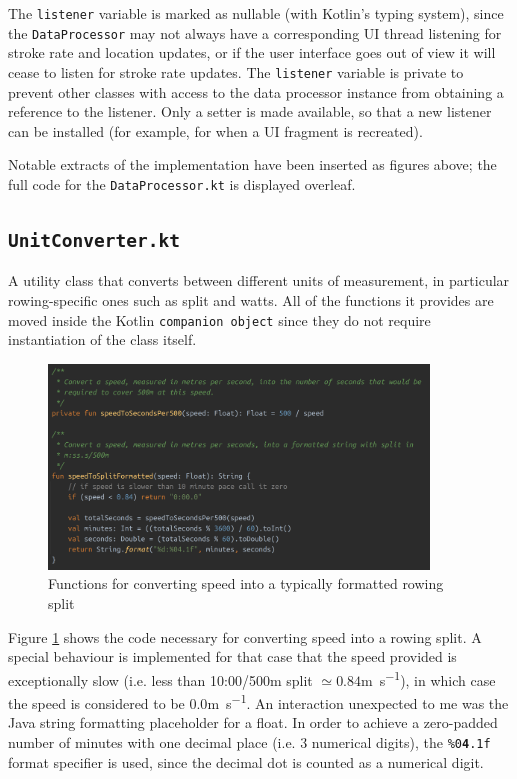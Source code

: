 \documentclass[11pt,twoside,a4paper]{report}
\begin{document}
The \texttt{listener} variable is marked as nullable (with Kotlin's typing system), since the \texttt{DataProcessor} may not always have a corresponding UI thread listening for stroke rate and location updates, or if the user interface goes out of view it will cease to listen for stroke rate updates. The \texttt{listener} variable is private to prevent other classes with access to the data processor instance from obtaining a reference to the listener. Only a setter is made available, so that a new listener can be installed (for example, for when a UI fragment is recreated).

Notable extracts of the implementation have been inserted as figures above; the full code for the \texttt{DataProcessor.kt} is displayed overleaf.



\subsection{\texttt{UnitConverter.kt}}

A utility class that converts between different units of measurement, in particular rowing-specific ones such as split and watts. All of the functions it provides are moved inside the Kotlin \texttt{companion object} since they do not require instantiation of the class itself. 

\begin{figure}[h!]
  \centering
  \includegraphics[width=0.9\textwidth]{code-splitformatting.png}
  \caption{Functions for converting speed into a typically formatted rowing split}
  \label{fig:splitformatting}
\end{figure}

Figure \ref{fig:splitformatting} shows the code necessary for converting speed into a rowing split. A special behaviour is implemented for that case that the speed provided is exceptionally slow (i.e. less than 10:00/500m split $\simeq 0.84$\si{\meter\per\second}), in which case the speed is considered to be $0.0$\si{\meter\per\second}. An interaction unexpected to me was the Java string formatting placeholder for a float. In order to achieve a zero-padded number of minutes with one decimal place (i.e. $3$ numerical digits), the \texttt{\%0\textbf{4}.1f} format specifier is used, since the decimal dot is counted as a numerical digit.
\end{document}

